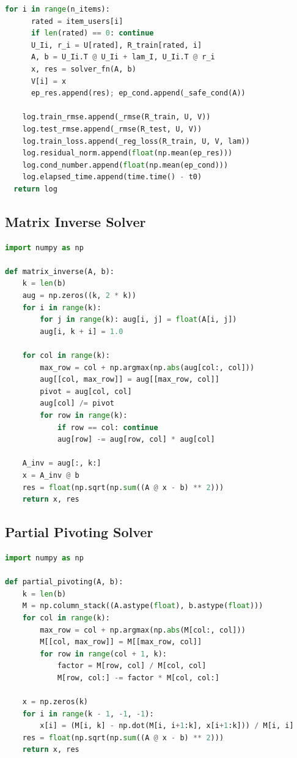 \begin{lstlisting}[language=Python, caption={ALS Engine Implementation}]
    for i in range(n_items):
      rated = item_users[i]
      if len(rated) == 0: continue
      U_Ii, r_i = U[rated], R_train[rated, i]
      A, b = U_Ii.T @ U_Ii + lam_I, U_Ii.T @ r_i
      x, res = solver_fn(A, b)
      V[i] = x
      ep_res.append(res); ep_cond.append(_safe_cond(A))

    log.train_rmse.append(_rmse(R_train, U, V))
    log.test_rmse.append(_rmse(R_test, U, V))
    log.train_loss.append(_reg_loss(R_train, U, V, lam))
    log.residual_norm.append(float(np.mean(ep_res)))
    log.cond_number.append(float(np.mean(ep_cond)))
    log.elapsed_time.append(time.time() - t0)
  return log
\end{lstlisting}

\subsection{Matrix Inverse Solver}
\begin{lstlisting}[language=Python, caption={Matrix Inverse Implementation}]
import numpy as np

def matrix_inverse(A, b):
    k = len(b)
    aug = np.zeros((k, 2 * k))
    for i in range(k):
        for j in range(k): aug[i, j] = float(A[i, j])
        aug[i, k + i] = 1.0

    for col in range(k):
        max_row = col + np.argmax(np.abs(aug[col:, col]))
        aug[[col, max_row]] = aug[[max_row, col]]
        pivot = aug[col, col]
        aug[col] /= pivot
        for row in range(k):
            if row == col: continue
            aug[row] -= aug[row, col] * aug[col]

    A_inv = aug[:, k:]
    x = A_inv @ b
    res = float(np.sqrt(np.sum((A @ x - b) ** 2)))
    return x, res
\end{lstlisting}

\subsection{Partial Pivoting Solver}
\begin{lstlisting}[language=Python, caption={Gaussian Elimination Implementation}]
import numpy as np

def partial_pivoting(A, b):
    k = len(b)
    M = np.column_stack((A.astype(float), b.astype(float)))
    for col in range(k):
        max_row = col + np.argmax(np.abs(M[col:, col]))
        M[[col, max_row]] = M[[max_row, col]]
        for row in range(col + 1, k):
            factor = M[row, col] / M[col, col]
            M[row, col:] -= factor * M[col, col:]

    x = np.zeros(k)
    for i in range(k - 1, -1, -1):
        x[i] = (M[i, k] - np.dot(M[i, i+1:k], x[i+1:k])) / M[i, i]
    res = float(np.sqrt(np.sum((A @ x - b) ** 2)))
    return x, res
\end{lstlisting}

